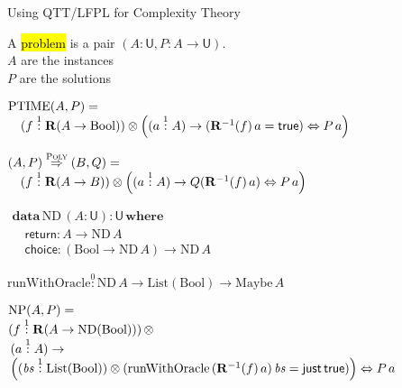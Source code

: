 \documentclass[xetex,aspectratio=169,14pt,hyperref={pdfpagelabels=true,pdflang={en-GB}}]{beamer}
\begin{document}
\begin{frame}
  \begin{center}
    Using QTT/LFPL for Complexity Theory
  \end{center}
\end{frame}

\newcommand{\BoolTy}{\mathrm{Bool}}
\newcommand{\cTrue}{\mathsf{true}}
\newcommand{\cFalse}{\mathsf{false}}
\newcommand{\ListTy}{\mathrm{List}}
\newcommand{\cNil}{\mathsf{nil}}
\newcommand{\cCons}{\mathsf{cons}}

\begin{frame}
  A \hl{problem} is a pair $(A : \mathsf{U}, P : A \to \mathsf{U})$.\\
  \qquad $A$ are the instances \\
  \qquad $P$ are the solutions

  \bigskip
  \pause

  $\begin{array}{@{}l}
      \mathrm{PTIME}(A,P) = \\
      \quad (f \stackrel1: \mathbf{R}(A \to \BoolTy)) \otimes \left((a \stackrel1: A) \to (\mathbf{R}^{-1}(f)\, a = \cTrue) \Leftrightarrow P\,a\right)
    \end{array}$

  \bigskip
  \pause

  $\begin{array}{@{}l}
    (A,P) \stackrel{\textsc{Poly}}\Rightarrow (B,Q) = \\
    \quad (f \stackrel1: \mathbf{R}(A \to B)) \otimes \left((a \stackrel1: A) \to Q(\mathbf{R}^{-1}(f)\,a) \Leftrightarrow P\,a\right)
  \end{array}$
\end{frame}

\begin{frame}
  $\begin{array}{l}
    \textbf{data}\,\mathrm{ND}\,(A : \mathsf{U}) : \mathsf{U}\,\textbf{where} \\
    \quad \mathsf{return} : A \to \mathrm{ND}\,A \\
    \quad \mathsf{choice} : (\BoolTy \to \mathrm{ND}\,A) \to \mathrm{ND}\,A
  \end{array}$

  \pause
  \bigskip

  $\mathrm{runWithOracle} \stackrel0: \mathrm{ND}\,A \to \ListTy(\BoolTy) \to \mathrm{Maybe}\,A$

  \pause
  \bigskip

  $\begin{array}[t]{@{}l}
      \mathrm{NP}(A,P) = \\
      (f \stackrel1: \mathbf{R}(A \to \mathrm{ND}(\BoolTy)))\, \otimes \\
      \, (a \stackrel1: A) \to \\
      \, \left((\mathit{bs} \stackrel1: \ListTy(\BoolTy)) \otimes (\mathrm{runWithOracle}\,(\mathbf{R}^{-1}(f)\,a)\,\mathit{bs} = \mathsf{just}\,\cTrue)\right) \Leftrightarrow P\,a
    \end{array}$
\end{frame}
\end{document}

